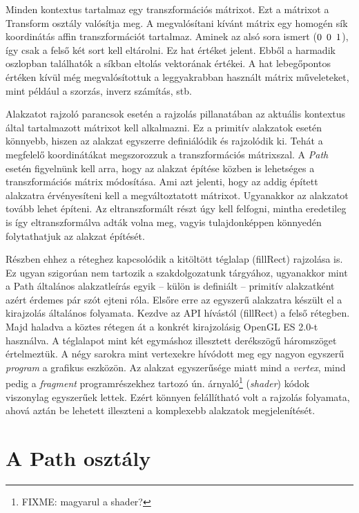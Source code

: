 \documentclass[12pt]{report}
\theoremstyle{definition}
\newcommand{\inenglish}[1]{\textsl{#1}}
\newcommand{\func}[1]{{\textsf{\footnotesize{#1}}}}
\begin{document}
Minden kontextus tartalmaz egy transzformációs mátrixot. Ezt a mátrixot a
\func{Transform} osztály valósítja meg. A megvalósítani kívánt mátrix egy
homogén sík koordinátás affin transzformációt tartalmaz. Aminek az alsó sora
ismert ($0\enskip 0\enskip 1$), így csak a felső két sort kell eltárolni. Ez
hat értéket jelent. Ebből a harmadik oszlopban találhatók a síkban eltolás
vektorának értékei. A hat lebegőpontos értéken kívül még megvalósítottuk a
leggyakrabban használt mátrix műveleteket, mint például a szorzás, inverz
számítás, stb.

Alakzatot rajzoló parancsok esetén a rajzolás pillanatában az aktuális
kontextus által tartalmazott mátrixot kell alkalmazni. Ez a primitív alakzatok
esetén könnyebb, hiszen az alakzat egyszerre definiálódik és rajzolódik ki.
Tehát a megfelelő koordinátákat megszorozzuk a transzformációs mátrixszal. A
\emph{Path} esetén figyelnünk kell arra, hogy az alakzat építése közben is
lehetséges a transzformációs mátrix módosítása. Ami azt jelenti, hogy az addig
épített alakzatra érvényesíteni kell a megváltoztatott mátrixot. Ugyanakkor az
alakzatot tovább lehet építeni. Az eltranszformált részt úgy kell felfogni,
mintha eredetileg is így eltranszformálva adták volna meg, vagyis
tulajdonképpen könnyedén folytathatjuk az alakzat építését.

Részben ehhez a réteghez kapcsolódik a kitöltött téglalap (\func{fillRect})
rajzolása is. Ez ugyan szigorúan nem tartozik a szakdolgozatunk tárgyához,
ugyanakkor mint a Path általános alakzatleírás egyik -- külön is definiált --
primitív alakzatként azért érdemes pár szót ejteni róla. Elsőre erre az
egyszerű alakzatra készült el a kirajzolás általános folyamata. Kezdve az API
hívástól (\func{fillRect}) a felső rétegben. Majd haladva a köztes rétegen át a
konkrét kirajzolásig OpenGL ES 2.0-t használva. A téglalapot mint két egymáshoz
illesztett derékszögű háromszöget értelmeztük. A négy sarokra mint vertexekre
hívódott meg egy nagyon egyszerű \emph{program} a grafikus eszközön. Az alakzat
egyszerűsége miatt mind a \emph{vertex}, mind pedig a \emph{fragment}
programrészekhez tartozó ún. árnyaló\footnote{FIXME: magyarul a shader?}
(\inenglish{shader}) kódok viszonylag egyszerűek lettek. Ezért könnyen
felállítható volt a rajzolás folyamata, ahová aztán be lehetett illeszteni a
komplexebb alakzatok megjelenítését.

    \section[A Path osztály]{A Path osztály}
    \label{A Path osztály}
\end{document}
